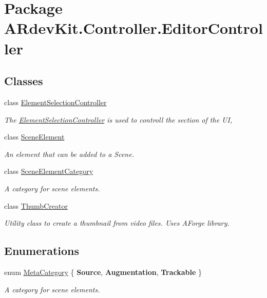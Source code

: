 \hypertarget{namespace_a_rdev_kit_1_1_controller_1_1_editor_controller}{\section{Package A\-Rdev\-Kit.\-Controller.\-Editor\-Controller}
\label{namespace_a_rdev_kit_1_1_controller_1_1_editor_controller}
}
\subsection*{Classes}
\begin{DoxyCompactItemize}
\item 
class \hyperlink{class_a_rdev_kit_1_1_controller_1_1_editor_controller_1_1_element_selection_controller}{Element\-Selection\-Controller}
\begin{DoxyCompactList}\small\item\em The \hyperlink{class_a_rdev_kit_1_1_controller_1_1_editor_controller_1_1_element_selection_controller}{Element\-Selection\-Controller} is used to controll the section of the U\-I, \end{DoxyCompactList}\item 
class \hyperlink{class_a_rdev_kit_1_1_controller_1_1_editor_controller_1_1_scene_element}{Scene\-Element}
\begin{DoxyCompactList}\small\item\em An element that can be added to a Scene. \end{DoxyCompactList}\item 
class \hyperlink{class_a_rdev_kit_1_1_controller_1_1_editor_controller_1_1_scene_element_category}{Scene\-Element\-Category}
\begin{DoxyCompactList}\small\item\em A category for scene elements. \end{DoxyCompactList}\item 
class \hyperlink{class_a_rdev_kit_1_1_controller_1_1_editor_controller_1_1_thumb_creator}{Thumb\-Creator}
\begin{DoxyCompactList}\small\item\em Utility class to create a thumbnail from video files. Uses A\-Forge library. \end{DoxyCompactList}\end{DoxyCompactItemize}
\subsection*{Enumerations}
\begin{DoxyCompactItemize}
\item 
enum \hyperlink{namespace_a_rdev_kit_1_1_controller_1_1_editor_controller_a304367964b3f3f5c115bb81e7b31d534}{Meta\-Category} \{ {\bfseries Source}, 
{\bfseries Augmentation}, 
{\bfseries Trackable}
 \}
\begin{DoxyCompactList}\small\item\em A category for scene elements. \end{DoxyCompactList}\end{DoxyCompactItemize}


